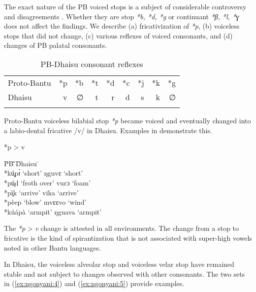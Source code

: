\documentclass[output=paper,colorlinks,citecolor=brown]{langscibook}
\begin{document}
The exact nature of the PB voiced stops is a subject of considerable controversy and disagreements \citep{Hyman2019, Mould1972}. Whether they are stop \textit{*b, *d, *g} \citep{Guthrie1967, Meeussen1967, Meinhof1932}  or continuant \textit{*β, *l, *ɣ} \citep{Meinhof1932}  does not affect the findings. We describe (a) fricativization of \textit{*p}, (b) voiceless stops that did not change, (c) various reflexes of voiced consonants, and (d) changes of PB palatal consonants.

\begin{table}
    \caption{PB-Dhaisu consonant reflexes}
    \label{tab:ngonyani:18}
    \begin{tabular}{l r r r r r r r r}
        \lsptoprule
         Proto-Bantu & *p & *b & *t & *d & *c & *j & *k & *g\\
         Dhaisu & v & ∅ & t & r & d & s & k & ∅ \\
        \lspbottomrule
    \end{tabular}
\end{table}

Proto-Bantu voiceless bilabial stop \textit{*p} became voiced and eventually changed into a labio-dental fricative /v/ in Dhaisu. Examples in  demonstrate this.

\ea%
	\label{ex:ngonyani:3}
	*p > v\\
    \begin{tabbing} 
        \= PB \quad\= \quad\= \quad\= \quad\= \quad\= \quad\= \quad\= \quad\= Dhaisu \quad\=  \quad\= \\
        \> *kú̧pɪ́ \> \>‘short’ \> \> \>  \> \> \> ŋguvɛ \> `short' \\
        \> *pú̧d \> \>‘froth over’ \>  \> \> \> \> \> vurɔ \> ‘foam’\\
        \> *pì̧k \> \>‘arrive’ \> \>  \> \> \> \> vika \> ‘arrive’\\
        \> *pèep \> \>‘blow’ \> \> \> \> \> \> mvɛɛvo \> ‘wind’\\
        \> *kúápà \> \>‘armpit’ \> \> \>  \> \> \> ŋguava \> ‘armpit’
    \end{tabbing}
\z
The  \textit{*p} > \textit{v}  change is attested in all environments. The change from a stop to fricative is the kind of spirantization that is not associated with super-high vowels noted in other Bantu languages.

In Dhaisu, the voiceless alveolar stop and voiceless velar stop have remained stable and not subject to changes observed with other consonants. The two sets in (\ref{ex:ngonyani:4}) and (\ref{ex:ngonyani:5}) provide examples.
\end{document}
